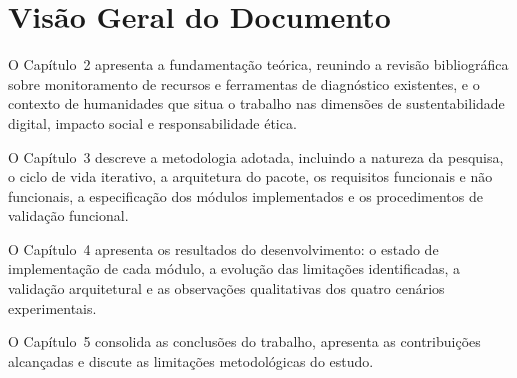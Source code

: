 \section{Visão Geral do Documento}

O Capítulo~2 apresenta a fundamentação teórica, reunindo a revisão bibliográfica sobre monitoramento de recursos e ferramentas de diagnóstico existentes, e o contexto de humanidades que situa o trabalho nas dimensões de sustentabilidade digital, impacto social e responsabilidade ética.

O Capítulo~3 descreve a metodologia adotada, incluindo a natureza da pesquisa, o ciclo de vida iterativo, a arquitetura do pacote, os requisitos funcionais e não funcionais, a especificação dos módulos implementados e os procedimentos de validação funcional.

O Capítulo~4 apresenta os resultados do desenvolvimento: o estado de implementação de cada módulo, a evolução das limitações identificadas, a validação arquitetural e as observações qualitativas dos quatro cenários experimentais.

O Capítulo~5 consolida as conclusões do trabalho, apresenta as contribuições alcançadas e discute as limitações metodológicas do estudo.

\clearpage
